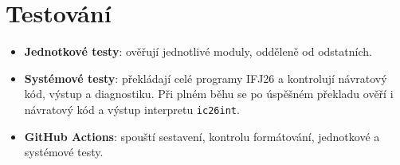 \section{Testování}

\begin{itemize}
  \item \textbf{Jednotkové testy}: ověřují jednotlivé moduly, odděleně od odstatních.
  \item \textbf{Systémové testy}: překládají celé programy IFJ26 a kontrolují návratový kód, výstup a diagnostiku. Při plném běhu se po úspěšném překladu ověří i návratový kód a výstup interpretu \texttt{ic26int}.
  \item \textbf{GitHub Actions}: spouští sestavení, kontrolu formátování, jednotkové a systémové testy.
\end{itemize}